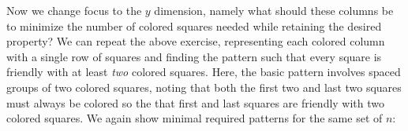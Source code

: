 \documentclass{article}
\begin{document}
{  Now we change focus to the $y$ dimension, namely what should these columns be to minimize the number of colored squares needed while retaining the desired property?
  We can repeat the above exercise, representing each colored column with a single row of squares and finding the pattern such that every square is friendly with at least \emph{two} colored squares.
  Here, the basic pattern involves spaced groups of two colored squares, noting that both the first two and last two squares must always be colored so the that first and last squares are friendly with two colored squares.
  We again show minimal required patterns for the same set of $n$:
  \begin{center}
    \begin{minipage}[t]{0.5\textwidth}
      \newline\newline
      \newline\newline
      \newline\newline
      \newline\newline
      \newline\newline
\end{minipage}
\end{center}}
\end{document}
